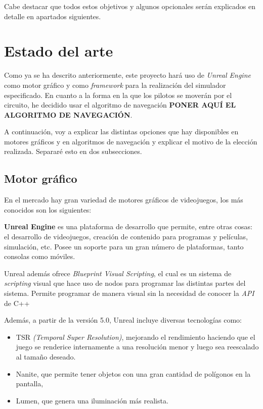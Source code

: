 \documentclass[a4paper,11pt]{book}
\begin{document}
Cabe destacar que todos estos objetivos y algunos opcionales serán explicados en detalle en apartados siguientes.

\section{Estado del arte}

Como ya se ha descrito anteriormente, este proyecto hará uso de \textit{Unreal Engine} como motor gráfico y como \textit{framework} para la realización del simulador especificado. En cuanto a la forma en la que los pilotos se moverán por el circuito, he decidido usar el algoritmo de navegación \textbf{PONER AQUÍ EL ALGORITMO DE NAVEGACIÓN}.

\bigskip

A continuación, voy a explicar las distintas opciones que hay disponibles en motores gráficos y en algoritmos de navegación y explicar el motivo de la elección realizada. Separaré esto en dos subsecciones.

\subsection{Motor gráfico}
En el mercado hay gran variedad de motores gráficos de videojuegos, los más conocidos son los siguientes:

\bigskip
\textbf{Unreal Engine} \cite{unreal} es una plataforma de desarrollo que permite, entre otras cosas: el desarrollo de videojuegos, creación de contenido para programas y películas, simulación, etc. Posee un soporte para un gran número de plataformas, tanto consolas como móviles.

\bigskip

Unreal además ofrece \textit{Blueprint Visual Scripting}, el cual es un sistema de \textit{scripting} visual que hace uso de nodos para programar las distintas partes del sistema. Permite programar de manera visual sin la necesidad de conocer la \textit{API} de C++ %

\bigskip

Además, a partir de la versión 5.0, Unreal incluye diversas tecnologías como: 

\begin{itemize}
   \item TSR \textit{(Temporal Super Resolution)}, mejorando el rendimiento haciendo que el juego se renderice internamente a una resolución menor y luego sea reescalado al tamaño deseado.
   \item Nanite, que permite tener objetos con una gran cantidad de polígonos en la pantalla, 
   \item Lumen, que genera una iluminación más realista. %
\end{itemize}
\end{document}
